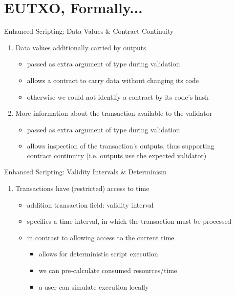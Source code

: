 \section{EUTXO, Formally...}

\begin{frame}{Enhanced Scripting: Data Values \& Contract Continuity}

\begin{enumerate}
\item \alert{Data values} additionally carried by outputs
  \begin{itemize}
  \item passed as extra argument of type  during validation
  \item allows a contract to carry data without changing its code
  \item otherwise we could not identify a contract by its code's hash
  \end{itemize}
\item More information about the transaction available to the validator
  \begin{itemize}
  \item passed as extra argument of type  during validation
  \item allows inspection of the transaction's outputs, thus supporting\\
\alert{contract continuity} (i.e. outputs use the expected validator)
  \end{itemize}
\seti
\end{enumerate}

\end{frame}

\begin{frame}{Enhanced Scripting: Validity Intervals \& Determinism}

\begin{enumerate}
\conti
\item Transactions have (restricted) access to time
  \begin{itemize}
  \item addition transaction field: \alert{validity interval}
  \item specifies a time interval, in which the transaction must be processed
  \item in contrast to allowing access to the current time
    \begin{itemize}
    \item allows for \alert{deterministic} script execution
    \item we can pre-calculate consumed resources/time
    \item a user can simulate execution locally
    \end{itemize}
  \end{itemize}
\end{enumerate}

\end{frame}

